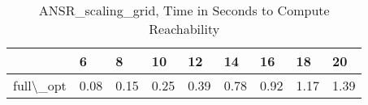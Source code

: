 \begin{table}
\centering
\caption{ANSR\_scaling\_grid, Time in Seconds to Compute Reachability}
\label{ANSR_scaling_grid_states_time}
\begin{tabular}{lllllllll}
\toprule
{} &     6 &     8 &    10 &    12 &    14 &    16 &    18 &    20 \\
\midrule
full\textbackslash \_opt &  0.08 &  0.15 &  0.25 &  0.39 &  0.78 &  0.92 &  1.17 &  1.39 \\
\bottomrule
\end{tabular}
\end{table}

